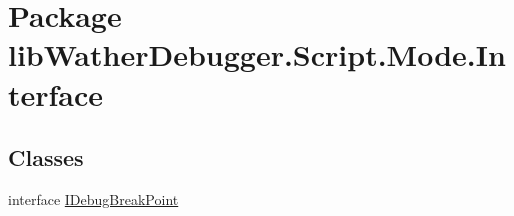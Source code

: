 \hypertarget{namespacelib_wather_debugger_1_1_script_1_1_mode_1_1_interface}{\section{Package lib\+Wather\+Debugger.\+Script.\+Mode.\+Interface}
\label{namespacelib_wather_debugger_1_1_script_1_1_mode_1_1_interface}
}
\subsection*{Classes}
\begin{DoxyCompactItemize}
\item 
interface \hyperlink{interfacelib_wather_debugger_1_1_script_1_1_mode_1_1_interface_1_1_i_debug_break_point}{I\+Debug\+Break\+Point}
\end{DoxyCompactItemize}
